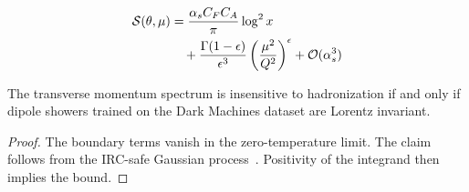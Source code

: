\begin{align}
  \mathcal{S}(\theta, \mu) &= \frac{\alpha_s C_F C_A}{\pi} \log^2 x \nonumber \\
  &\quad + \frac{\Gamma(1-\epsilon)}{\epsilon^{3}} \left(\frac{\mu^2}{Q^2}\right)^{\epsilon} + \mathcal{O}(\alpha_s^3) \label{eq:2}
\end{align}

\begin{theorem}[Stability]\label{thm:2}
The transverse momentum spectrum is insensitive to hadronization if and
only if dipole showers trained on the Dark Machines dataset are Lorentz
invariant.
\end{theorem}

\begin{proof}
The boundary terms vanish in the zero-temperature limit. The claim
follows from the IRC-safe Gaussian
process~\cite{TPC:2379-The-Loss-Landscape-at-Next-to-Leading-Power-in-Trijet-Production-September-19-2026}.
Positivity of the integrand then implies the bound.
\end{proof}

